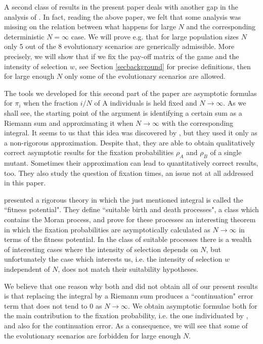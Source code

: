 \documentclass[12pt]{article}
\begin{document}
A second class of results in the present paper deals with another gap in the analysis of \cite{taylor}. In fact, reading the above paper, we felt that some analysis was missing on the relation between what happens for large $N$ and the corresponding deterministic $N=\infty$ case. We will prove e.g. that for large population sizes $N$ only 5 out of the 8 evolutionary scenarios are generically admissible. More precisely, we will show that if we fix the pay-off matrix of the game and the intensity of selection $w$, see Section \ref{secbackground} for precise definitions, then for large enough $N$ only some of the evolutionary scenarios are allowed.  

The tools we developed for this second part of the paper are asymptotic formulas for $\pi_i$ when the fraction $i/N$ of A individuals is held fixed and $N \rightarrow \infty$. As we shall see, the starting point of the argument is identifying a certain sum as a Riemann sum and approximating it when $N \rightarrow \infty$ with the corresponding integral. It seems to us that this idea was discovered by \cite{AntalScheuring}, but they used it only as a non-rigorous approximation. Despite that, they are able to obtain qualitatively correct asymptotic results for the fixation probabilities $\rho_A$ and $\rho_B$ of a single mutant. Sometimes their approximation can lead to quantitatively correct results, too. They also study the question of fixation times, an issue not at all addressed in this paper.

\cite{ChalubSouza2016} presented a rigorous theory in which the just mentioned integral is called the ``fitness potential". They define ``suitable birth and death processes", a class which contains the Moran process, and prove for these processes an interesting theorem in which the fixation probabilities are asymptotically calculated as $N \rightarrow \infty$ in terms of the fitness potential. In the class of suitable processes there is a wealth of interesting cases where the intensity of selection depends on $N$, but unfortunately the case which interests us, i.e. the intensity of selection $w$ independent of $N$, does not match their suitability hypotheses.

We believe that one reason why both \cite{AntalScheuring} and \cite{ChalubSouza2016} did not obtain all of our present results is that replacing the integral by a Riemann sum produces a ``continuation" error term that does not tend to 0 as $N \rightarrow \infty$. We obtain asymptotic formulae both for the main contribution to the fixation probability, i.e. the one individuated by \cite{AntalScheuring}, and also for the continuation error. As a consequence, we will see that some of the evolutionary scenarios are forbidden for large enough $N$. 
\end{document}
